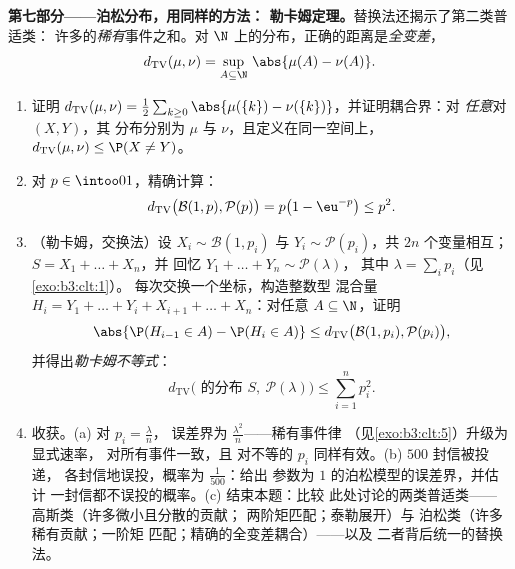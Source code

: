 \begin{problem}
\medskip
\noindent\textbf{第七部分——泊松分布，用同样的方法：
勒卡姆定理。}替换法还揭示了第二类普适类：
许多的\emph{稀有}事件之和。对
$\N$ 上的分布，正确的距离是\emph{全变差}，
\[
d_{\mathrm{TV}}(\mu, \nu) = \sup_{A\subseteq\N}\,
\abs{\mu(A) - \nu(A)} .
\]
\begin{enumerate}[resume]
  \item 证明 $d_{\mathrm{TV}}(\mu, \nu) =
        \frac12\sum_{k\geq0}\abs{\mu(\{k\}) -
        \nu(\{k\})}$，并证明耦合界：对
        \emph{任意}对 $(X, Y)$，其
        分布分别为 $\mu$ 与 $\nu$，且定义在同一空间上，
        $d_{\mathrm{TV}}(\mu, \nu) \leq \P(X \neq Y)$。
  \item 对 $p \in \intoo01$，精确计算：
        \[
        d_{\mathrm{TV}}\bigl(\mathcal B(1, p), \mathcal
        P(p)\bigr) = p\bigl(1 - \eu^{-p}\bigr) \leq p^2 .
        \]
  \item （勒卡姆，交换法）设 $X_i \sim \mathcal B(1,
        p_i)$ 与 $Y_i \sim \mathcal P(p_i)$，共 $2n$
        个变量相互；$S = X_1 + \dots + X_n$，并
        回忆 $Y_1 + \dots + Y_n \sim \mathcal P(\lambda)$，
        其中 $\lambda = \sum_ip_i$（见\cref{exo:b3:clt:1}）。
        每次交换一个坐标，构造整数型
        混合量 $H_i = Y_1 + \dots + Y_i + X_{i+1} + \dots
        + X_n$：对任意 $A \subseteq \N$，证明
        \[
        \abs{\P(H_{i-1} \in A) - \P(H_i \in A)} \leq
        d_{\mathrm{TV}}\bigl(\mathcal B(1, p_i), \mathcal
        P(p_i)\bigr),
        \]
        并得出\emph{勒卡姆不等式}：
        \[
        d_{\mathrm{TV}}\bigl(\text{ 的分布 } S,\ \mathcal
        P(\lambda)\bigr) \leq \sum_{i=1}^np_i^2 .
        \]
  \item 收获。(a) 对 $p_i = \frac\lambda n$，
        误差界为 $\frac{\lambda^2}n$——稀有事件律
        （见\cref{exo:b3:clt:5}）升级为显式速率，
        对所有事件一致，且
        对不等的 $p_i$ 同样有效。(b) $500$ 封信被投递，
        各封信地误投，概率为
        $\frac1{500}$：给出
        参数为 $1$ 的泊松模型的误差界，并估计
        一封信都不误投的概率。(c) 结束本题：比较
        此处讨论的两类普适类——
        高斯类（许多微小且分散的贡献；
        两阶矩匹配；泰勒展开）与
        泊松类（许多稀有贡献；一阶矩
        匹配；精确的全变差耦合）——以及
        二者背后统一的替换法。


\end{enumerate}
\end{problem}
